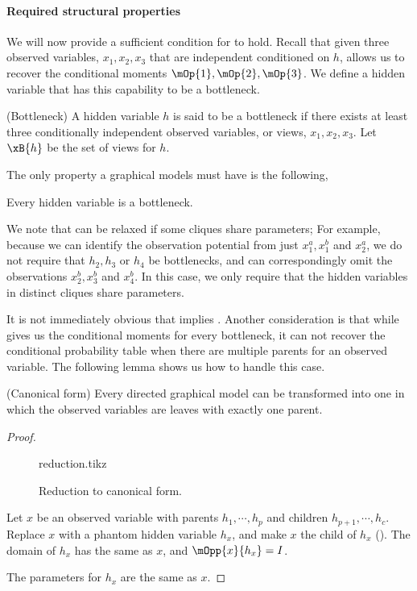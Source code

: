 \paragraph{Required structural properties}

We will now provide a sufficient condition for
 to hold. 
Recall that given three observed
variables, $x_1, x_2, x_3$ that are independent conditioned on $h$,
\TensorFactorize allows us to recover the conditional moments $\mOp{1},
\mOp{2}, \mOp{3}$. We define a hidden variable that has this capability to be a bottleneck.
\begin{definition}(Bottleneck)
  A hidden variable $h$ is said to be a bottleneck if there exists at
    least three conditionally independent observed variables, or views,
    $x_1, x_2, x_3$. 
  Let $\xB{h}$ be the set of views for $h$.
\end{definition}

The only property a graphical models must have is the following,
\begin{property}
  \label{prop:bottleneck}
  Every hidden variable is a bottleneck.
\end{property}

We note that  can be relaxed if some cliques
  share parameters;
For example, because we can identify the observation potential from just
  $x^a_1, x^b_1$ and $x^a_2$, we do not require that $h_2, h_3$ or $h_4$
  be bottlenecks, and can correspondingly omit the observations $x^b_2,
  x^b_3$ and $x^b_4$.
In this case, we only require that the hidden variables in distinct
  cliques share parameters.

It is not immediately obvious that  implies
  . 
Another consideration is that while
  \TensorFactorize gives us the conditional moments for every
  bottleneck, it can not recover the conditional probability table when
  there are multiple parents for an observed variable.
The following lemma shows us how to handle this case.

\begin{lemma}(Canonical form) 
  Every directed graphical model can be transformed into one in which
  the observed variables are leaves with exactly one parent.
\end{lemma}
\begin{proof}
  \begin{figure}
    \label{fig:reduction}
    \centering
    {reduction.tikz}
    \caption{Reduction to canonical form.}
  \end{figure}

  Let $x$ be an observed variable with parents $h_1, \cdots, h_p$ and
  children $h_{p+1}, \cdots, h_c$. Replace $x$ with a phantom hidden
  variable $h_x$, and make $x$ the child of $h_x$ (). The domain of $h_x$
  has the same as $x$, and $\mOpp{x}{h_x} = I$.

  The parameters for $h_x$ are the same as $x$.
\end{proof}

